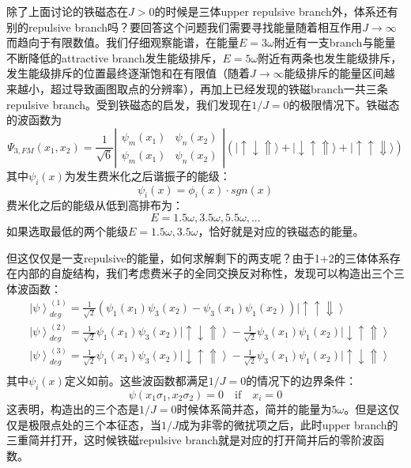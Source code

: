除了上面讨论的铁磁态在$J>0$的时候是三体upper repulsive branch外，体系还有别的repulsive branch吗？要回答这个问题我们需要寻找能量随着相互作用$J\to\infty$而趋向于有限数值。我们仔细观察能谱，在能量$E=3\omega$附近有一支branch与能量不断降低的attractive branch发生能级排斥，$E=5\omega$附近有两条也发生能级排斥，发生能级排斥的位置最终逐渐饱和在有限值（随着$J\to\infty$能级排斥的能量区间越来越小，超过导致画图取点的分辨率），再加上已经发现的铁磁branch一共三条repulsive branch。受到铁磁态的启发，我们发现在$1/J=0$的极限情况下。铁磁态的波函数为
\begin{equation}
\Psi_{3,FM}(x_1,x_2)=\frac{1}{\sqrt{6}}\left|\begin{array}{cc}\psi_m(x_1) & \psi_n(x_2) \\\psi_m(x_1) & \psi_n(x_2)\end{array}\right| \left(|\uparrow\downarrow\Uparrow\rangle+|\downarrow\uparrow\Uparrow\rangle+|\uparrow\uparrow\Downarrow\rangle\right)
\end{equation}
其中$\psi_i(x)$为发生费米化之后谐振子的能级：
\begin{equation}
\psi_i(x) = \phi_{i}(x) \cdot sgn(x) 
\end{equation}
费米化之后的能级从低到高排布为：
\begin{equation}
E = 1.5\omega, 3.5\omega, 5.5\omega, ...
\end{equation}
如果选取最低的两个能级$E=1.5\omega, 3.5\omega$，恰好就是对应的铁磁态的能量。

但这仅仅是一支repulsive的能量，如何求解剩下的两支呢？由于1+2的三体体系存在内部的自旋结构，我们考虑费米子的全同交换反对称性，发现可以构造出三个三体波函数：
\begin{equation}
    \begin{split}
        &\left|\psi\right>^{(1)}_{deg} =  \frac{1}{\sqrt{2}} (\psi_1(x_1)\psi_3(x_2)- \psi_3(x_1)\psi_1(x_2)) \left|\uparrow \uparrow \Downarrow \right>\\
        &\left|\psi\right>^{(2)}_{deg} = \frac{1}{\sqrt{2}}\psi_1(x_1)\psi_3(x_2)\left|\uparrow \downarrow \Uparrow \right> - \frac{1}{\sqrt{2}}\psi_3(x_1)\psi_1(x_2)\left|\downarrow \uparrow \Uparrow \right>\\
        &\left|\psi\right>^{(3)}_{deg} = \frac{1}{\sqrt{2}}\psi_1(x_1)\psi_3(x_2)\left|\downarrow \uparrow \Uparrow \right> - \frac{1}{\sqrt{2}}\psi_3(x_1)\psi_1(x_2)\left|\uparrow \downarrow \Uparrow \right>\\
    \end{split}
\end{equation}
其中$\psi_i(x)$定义如前。这些波函数都满足$1/J=0$的情况下的边界条件：
\begin{equation}
    \psi(x_1\sigma_1,x_2\sigma_2) = 0 \quad \text{if} \quad x_i =0
\end{equation}
这表明，构造出的三个态是$1/J=0$时候体系简并态，简并的能量为$5\omega$。但是这仅仅是极限点处的三个本征态，当$1/J$成为非零的微扰项之后，此时upper branch的三重简并打开，这时候铁磁repulsive branch就是对应的打开简并后的零阶波函数。

